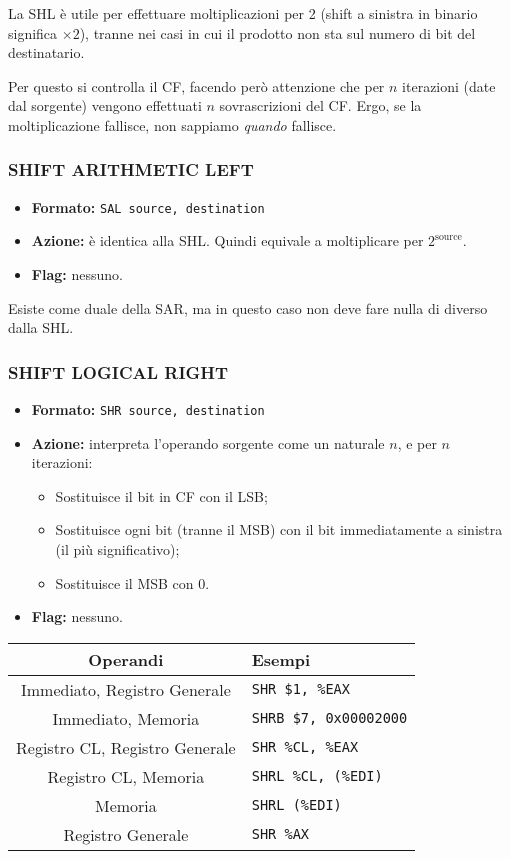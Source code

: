 \documentclass[a4paper,11pt]{article}
\begin{document}
La SHL è utile per effettuare moltiplicazioni per 2 (shift a sinistra in binario significa $\times 2$), tranne nei casi in cui il prodotto non sta sul numero di bit del destinatario.

Per questo si controlla il CF, facendo però attenzione che per $n$ iterazioni (date dal sorgente) vengono effettuati $n$ sovrascrizioni del CF.
Ergo, se la moltiplicazione fallisce, non sappiamo \textit{quando} fallisce.

\subsubsection{SHIFT ARITHMETIC LEFT}
\begin{itemize}
	\item \textbf{Formato:} \texttt{SAL source, destination}
	\item \textbf{Azione:} è identica alla SHL. 
		Quindi equivale a moltiplicare per $2^\text{source}$.
	\item \textbf{Flag:} nessuno.
\end{itemize}

Esiste come duale della SAR, ma in questo caso non deve fare nulla di diverso dalla SHL.

\subsubsection{SHIFT LOGICAL RIGHT}
\begin{itemize}
	\item \textbf{Formato:} \texttt{SHR source, destination}
	\item \textbf{Azione:} interpreta l'operando sorgente come un naturale $n$, e per $n$ iterazioni:
		\begin{itemize}
			\item Sostituisce il bit in CF con il LSB;
			\item Sostituisce ogni bit (tranne il MSB) con il bit immediatamente a sinistra (il più significativo);
			\item Sostituisce il MSB con 0.
		\end{itemize}
	\item \textbf{Flag:} nessuno.
\end{itemize}

		\begin{table}[H]
		\center {}
			\begin{tabular} { c | p{5cm} }
				\bfseries Operandi & \bfseries Esempi \\
				\hline
				Immediato, Registro Generale & \texttt{SHR \$1, \%EAX} \\
				Immediato, Memoria & \texttt{SHRB \$7, 0x00002000} \\
				Registro CL, Registro Generale & \texttt{SHR \%CL, \%EAX} \\
				Registro CL, Memoria & \texttt{SHRL \%CL, (\%EDI)} \\
				Memoria & \texttt{SHRL (\%EDI)} \\ 
				Registro Generale & \texttt{SHR \%AX}
			\end{tabular}
		\end{table}
\end{document}
